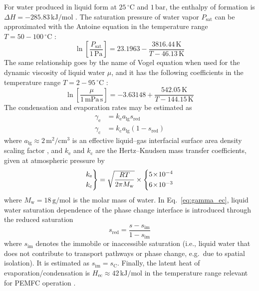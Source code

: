 \documentclass[fontsize=9pt,DIV=calc,a4paper,twocolumn]{scrartcl}
\begin{document}
For water produced in liquid form at $25\,^\circ\mathrm{C}$ and $1\,\mathrm{bar}$, the enthalpy of formation is $\Delta H=-285.83\,\mathrm{kJ/mol}$ \cite{chase:98}. The saturation pressure of water vapor $P_\mathrm{sat}$ can be approximated with the Antoine equation in the temperature range $T=50{-}100\,^\circ\mathrm{C}$ \cite{green:08}:
%
\begin{equation}
\ln\left[\frac{P_\mathrm{sat}}{1\,\mathrm{Pa}}\right] = 23.1963 - \frac{3816.44\,\mathrm{K}}{T-46.13\,\mathrm{K}}
\end{equation}
%
The same relationship goes by the name of Vogel equation when used for the dynamic viscosity of liquid water $\mu$, and it has the following coefficients in the temperature range $T=2{-}95\,^\circ\mathrm{C}$ \cite{goletz:77}:
%
\begin{equation}
\ln\left[\frac{\mu}{1\,\mathrm{mPa\,s}}\right] = -3.63148 + \frac{542.05\,\mathrm{K}}{T-144.15\,\mathrm{K}}
\end{equation}
%
The condensation and evaporation rates may be estimated as \cite{nam:03,wu:09b}
%
\begin{equation}
\label{eq:gamma_ec}
\begin{aligned}
\gamma_\mathrm{e} &= k_\mathrm{e}a_\mathrm{lg}s_\mathrm{red}\\
\gamma_\mathrm{c} &= k_\mathrm{c}a_\mathrm{lg}(1-s_\mathrm{red})
\end{aligned}
\end{equation}
%
where $a_\mathrm{lg}\approx2\,\mathrm{m}^2/\mathrm{cm}^3$ is an effective liquid--gas interfacial surface area density scaling factor \cite{wu:09b}, and $k_\mathrm{e}$ and $k_\mathrm{c}$ are the Hertz--Knudsen mass transfer coefficients, given at atmospheric pressure by \cite{marek:01}
%
\begin{equation}
\begin{rcases*}
k_\mathrm{e}\\
k_\mathrm{c}
\end{rcases*}
= \sqrt{\frac{RT}{2\pi M_\mathrm{w}}}
\times\begin{cases*}
5\!\times\!10^{-4}\\
6\!\times\!10^{-3}
\end{cases*}
\end{equation}
%
where $M_\mathrm{w}=18\,\mathrm{g}/\mathrm{mol}$ is the molar mass of water. In Eq.~\ref{eq:gamma_ec}, liquid water saturation dependence of the phase change interface is introduced through the reduced saturation
%
\begin{equation}
s_\mathrm{red} = \frac{s-s_\mathrm{im}}{1-s_\mathrm{im}}
\end{equation}
%
where $s_\mathrm{im}$ denotes the immobile or inaccessible saturation (i.e., liquid water that does not contribute to transport pathways or phase change, e.g.\ due to spatial isolation). It is estimated as $s_\mathrm{im}=s_\mathrm{C}$. Finally, the latent heat of evaporation/condensation is $H_\mathrm{ec}\approx42\,\mathrm{kJ/mol}$ in the temperature range relevant for PEMFC operation \cite{haynes:16}.
\end{document}
